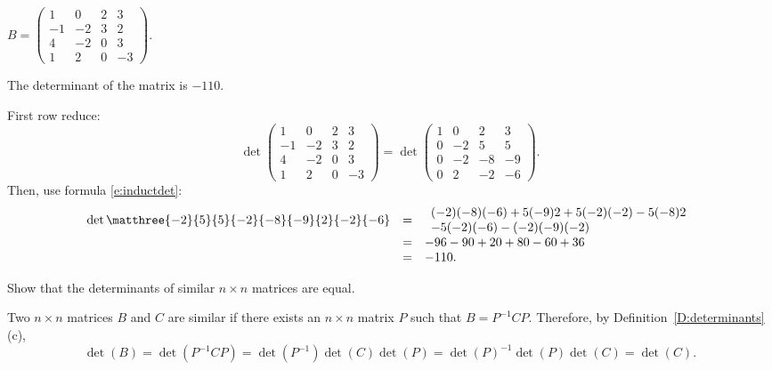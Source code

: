 \documentclass{article}
\begin{document}
\begin{exercise} \label{c10.1.1b}
$B = \left(\begin{array}{rrrr} 1 & 0 & 2 & 3 \\ -1 & -2 & 3 & 2
\\ 4 & -2 & 0 & 3 \\ 1 & 2 & 0 & -3 \end{array} \right)$.

\begin{solution}

\ans The determinant of the matrix is $-110$.

\soln First row reduce:
\[
\det\left(\begin{array}{rrrr}
1 & 0 & 2 & 3 \\ 
-1 & -2 & 3 & 2 \\
4 & -2 & 0 & 3 \\
1 & 2 & 0 & -3 \end{array}\right) =
\det\left(\begin{array}{rrrr}
1 & 0 & 2 & 3 \\ 
0 & -2 & 5 & 5 \\
0 & -2 & -8 & -9 \\
0 & 2 & -2 & -6 \end{array}\right).
\]
Then, use formula \eqref{e:inductdet}:
\[ \begin{array}{rcl}
\det\matthree{-2}{5}{5}{-2}{-8}{-9}{2}{-2}{-6} & = &
\begin{array}{l}
(-2)(-8)(-6) + 5(-9)2 + 5(-2)(-2) - 5(-8)2 \\
- 5(-2)(-6) - (-2)(-9)(-2) \end{array} \\
& = & -96 - 90 + 20 + 80 - 60 + 36 \\
& = & -110.
\end{array}
\]

\end{solution}
\end{exercise}





\problemlabel



\begin{exercise} \label{c10.1.3}
Show that the determinants of similar $n\times n$ matrices are
equal. 

\begin{solution}

Two $n \times n$ matrices $B$ and $C$ are similar if there exists
an $n \times n$ matrix $P$ such that $B = P^{-1}CP$.  Therefore, by
Definition~\ref{D:determinants}(c),
\[
\det(B) = \det(P^{-1}CP)
= \det(P^{-1})\det(C)\det(P)
= \det(P)^{-1}\det(P)\det(C)
= \det(C).
\]

\end{solution}
\end{exercise}
\end{document}
